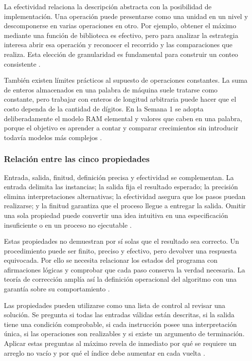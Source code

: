 \documentclass[12pt,letterpaper]{article}
\begin{document}
La efectividad relaciona la descripción abstracta con la posibilidad de implementación. Una operación puede presentarse como una unidad en un nivel y descomponerse en varias operaciones en otro. Por ejemplo, obtener el máximo mediante una función de biblioteca es efectivo, pero para analizar la estrategia interesa abrir esa operación y reconocer el recorrido y las comparaciones que realiza. Esta elección de granularidad es fundamental para construir un conteo consistente \citep{sedgewick2011,skiena2020,knuth1997}.

También existen límites prácticos al supuesto de operaciones constantes. La suma de enteros almacenados en una palabra de máquina suele tratarse como constante, pero trabajar con enteros de longitud arbitraria puede hacer que el costo dependa de la cantidad de dígitos. En la Semana 1 se adopta deliberadamente el modelo RAM elemental y valores que caben en una palabra, porque el objetivo es aprender a contar y comparar crecimientos sin introducir todavía modelos más complejos \citep{cook1973,cormen2022,zanabria2026}.

\subsubsection{Relación entre las cinco propiedades}

Entrada, salida, finitud, definición precisa y efectividad se complementan. La entrada delimita las instancias; la salida fija el resultado esperado; la precisión elimina interpretaciones alternativas; la efectividad asegura que los pasos puedan realizarse; y la finitud garantiza que el proceso llegue a entregar la salida. Omitir una sola propiedad puede convertir una idea intuitiva en una especificación insuficiente o en un proceso no ejecutable \citep{zanabria2026,cormen2022,knuth1997}.

Estas propiedades no demuestran por sí solas que el resultado sea correcto. Un procedimiento puede ser finito, preciso y efectivo, pero devolver una respuesta equivocada. Por ello se necesita relacionar los estados del programa con afirmaciones lógicas y comprobar que cada paso conserva la verdad necesaria. La teoría de corrección amplía así la definición operacional del algoritmo con una garantía sobre su comportamiento \citep{hoare1969,dijkstra1975,cormen2022}.

Las propiedades pueden utilizarse como una lista de control al revisar una solución. Se pregunta si todas las entradas válidas están descritas, si la salida tiene una condición comprobable, si cada instrucción posee una interpretación única, si las operaciones son realizables y si existe un argumento de terminación. Aplicar estas preguntas al máximo revela de inmediato por qué se requiere un arreglo no vacío y por qué el índice debe aumentar en cada vuelta \citep{zanabria2026,aho1974,cormen2022}.
\end{document}
